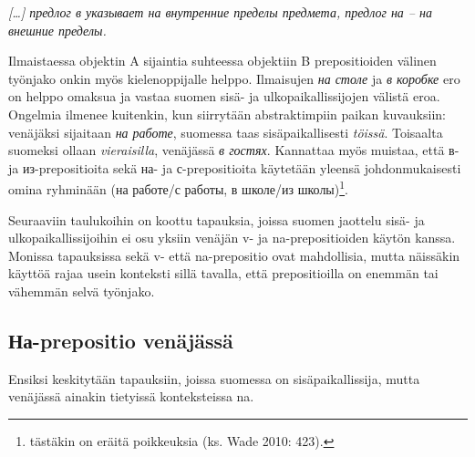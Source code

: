\documentclass[]{scrreprt}
\begin{document}
\emph{{[}\ldots{}{]} предлог в указывает на внутренние пределы предмета,
предлог на -- на внешние пределы.}

Ilmaistaessa objektin A sijaintia suhteessa objektiin B prepositioiden
välinen työnjako onkin myös kielenoppijalle helppo. Ilmaisujen \emph{на
столе} ja \emph{в коробке} ero on helppo omaksua ja vastaa suomen sisä-
ja ulkopaikallissijojen välistä eroa. Ongelmia ilmenee kuitenkin, kun
siirrytään abstraktimpiin paikan kuvauksiin: venäjäksi sijaitaan
\emph{на работе}, suomessa taas sisäpaikallisesti \emph{töissä}.
Toisaalta suomeksi ollaan \emph{vieraisilla}, venäjässä \emph{в гостях}.
Kannattaa myös muistaa, että в- ja из-prepositioita sekä на- ja
с-prepositioita käytetään yleensä johdonmukaisesti omina ryhminään (на
работе/с работы, в школе/из школы)\footnote{tästäkin on eräitä
  poikkeuksia (ks. Wade 2010: 423).}.

Seuraaviin taulukoihin on koottu tapauksia, joissa suomen jaottelu sisä-
ja ulkopaikallissijoihin ei osu yksiin venäjän v- ja na-prepositioiden
käytön kanssa. Monissa tapauksissa sekä v- että na-prepositio ovat
mahdollisia, mutta näissäkin käyttöä rajaa usein konteksti sillä
tavalla, että prepositioilla on enemmän tai vähemmän selvä työnjako.

\subsection{На-prepositio
venäjässä}\label{ux43dux430-prepositio-venuxe4juxe4ssuxe4}

Ensiksi keskitytään tapauksiin, joissa suomessa on sisäpaikallissija,
mutta venäjässä ainakin tietyissä konteksteissa na.
\end{document}
